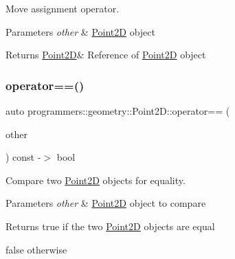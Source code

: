Move assignment operator. 


\begin{DoxyParams}{Parameters}
{\em other} & \hyperlink{classprogrammers_1_1geometry_1_1Point2D}{Point2D} object \\
\hline
\end{DoxyParams}
\begin{DoxyReturn}{Returns}
\hyperlink{classprogrammers_1_1geometry_1_1Point2D}{Point2D}\& Reference of \hyperlink{classprogrammers_1_1geometry_1_1Point2D}{Point2D} object 
\end{DoxyReturn}
\mbox{\label{classprogrammers_1_1geometry_1_1Point2D_a901c0de565aba1fd759ea5d3badcf318}} 
\subsubsection{\texorpdfstring{operator==()}{operator==()}}
{\footnotesize\ttfamily auto programmers\+::geometry\+::\+Point2\+D\+::operator== (\begin{DoxyParamCaption}\item[{const \hyperlink{classprogrammers_1_1geometry_1_1Point2D}{Point2D} \&}]{other }\end{DoxyParamCaption}) const -\/$>$  bool}



Compare two \hyperlink{classprogrammers_1_1geometry_1_1Point2D}{Point2D} objects for equality. 


\begin{DoxyParams}{Parameters}
{\em other} & \hyperlink{classprogrammers_1_1geometry_1_1Point2D}{Point2D} object to compare \\
\hline
\end{DoxyParams}
\begin{DoxyReturn}{Returns}
true if the two \hyperlink{classprogrammers_1_1geometry_1_1Point2D}{Point2D} objects are equal 

false otherwise 
\end{DoxyReturn}
\mbox{\label{classprogrammers_1_1geometry_1_1Point2D_a1bf5f23afe2acf9056a214d0b2a22c8b}} 

